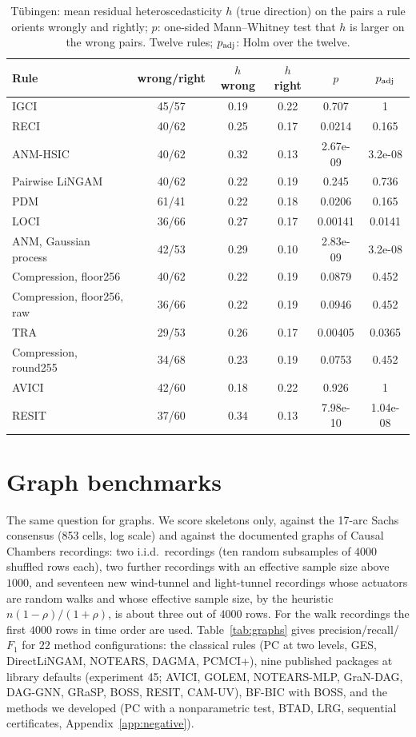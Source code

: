 \begin{table}[t]
\caption{T\"ubingen: mean residual heteroscedasticity $h$ (true direction) on the pairs a rule orients wrongly and rightly; $p$: one-sided Mann--Whitney test that $h$ is larger on the wrong pairs. Twelve rules; $p_{\rm adj}$: Holm over the twelve.}
\label{tab:h2}
\small
\begin{tabular}{@{}lccccc@{}}
\toprule
Rule & wrong/right & $h$ wrong & $h$ right & $p$ & $p_{\rm adj}$\\
\midrule
IGCI & 45/57 & 0.19 & 0.22 & 0.707 & 1\\
RECI & 40/62 & 0.25 & 0.17 & 0.0214 & 0.165\\
ANM-HSIC & 40/62 & 0.32 & 0.13 & 2.67e-09 & 3.2e-08\\
Pairwise LiNGAM & 40/62 & 0.22 & 0.19 & 0.245 & 0.736\\
PDM & 61/41 & 0.22 & 0.18 & 0.0206 & 0.165\\
LOCI & 36/66 & 0.27 & 0.17 & 0.00141 & 0.0141\\
ANM, Gaussian process & 42/53 & 0.29 & 0.10 & 2.83e-09 & 3.2e-08\\
Compression, floor256 & 40/62 & 0.22 & 0.19 & 0.0879 & 0.452\\
Compression, floor256, raw & 36/66 & 0.22 & 0.19 & 0.0946 & 0.452\\
TRA & 29/53 & 0.26 & 0.17 & 0.00405 & 0.0365\\
Compression, round255 & 34/68 & 0.23 & 0.19 & 0.0753 & 0.452\\
AVICI & 42/60 & 0.18 & 0.22 & 0.926 & 1\\
RESIT & 37/60 & 0.34 & 0.13 & 7.98e-10 & 1.04e-08\\
\bottomrule
\end{tabular}
\end{table}

\section{Graph benchmarks}\label{sec:graphs}

The same question for graphs. We score skeletons only, against the 17-arc Sachs consensus (853 cells, log scale) and against the documented graphs of Causal Chambers recordings: two i.i.d.\ recordings (ten random subsamples of $4000$ shuffled rows each), two further recordings with an effective sample size above $1000$, and seventeen new wind-tunnel and light-tunnel recordings whose actuators are random walks and whose effective sample size, by the heuristic $n(1-\rho)/(1+\rho)$, is about three out of $4000$ rows. For the walk recordings the first $4000$ rows in time order are used. Table~\ref{tab:graphs} gives precision/recall/$F_1$ for $22$ method configurations: the classical rules (PC at two levels, GES, DirectLiNGAM, NOTEARS, DAGMA, PCMCI+), nine published packages at library defaults (experiment 45; AVICI, GOLEM, NOTEARS-MLP, GraN-DAG, DAG-GNN, GRaSP, BOSS, RESIT, CAM-UV), BF-BIC with BOSS, and the methods we developed (PC with a nonparametric test, BTAD, LRG, sequential certificates, Appendix~\ref{app:negative}).

